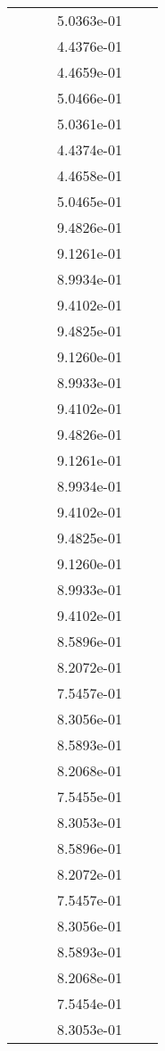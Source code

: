 \begin{xltabular}{\textwidth}{r|rS[table-format=1.3e+2]S[table-format=1.4e+2]S[table-format=1.4e+2]S[table-format=-1.5]}
&  &  & 5.0363e-01 & & \\
&  &  & 4.4376e-01 & & \\
&  &  & 4.4659e-01 & & \\
&  &  & 5.0466e-01 & & \\
&  &  & 5.0361e-01 & & \\
&  &  & 4.4374e-01 & & \\
&  &  & 4.4658e-01 & & \\
&  &  & 5.0465e-01 & & \\
&  &  & 9.4826e-01 & & \\
&  &  & 9.1261e-01 & & \\
&  &  & 8.9934e-01 & & \\
&  &  & 9.4102e-01 & & \\
&  &  & 9.4825e-01 & & \\
&  &  & 9.1260e-01 & & \\
&  &  & 8.9933e-01 & & \\
&  &  & 9.4102e-01 & & \\
&  &  & 9.4826e-01 & & \\
&  &  & 9.1261e-01 & & \\
&  &  & 8.9934e-01 & & \\
&  &  & 9.4102e-01 & & \\
&  &  & 9.4825e-01 & & \\
&  &  & 9.1260e-01 & & \\
&  &  & 8.9933e-01 & & \\
&  &  & 9.4102e-01 & & \\
&  &  & 8.5896e-01 & & \\
&  &  & 8.2072e-01 & & \\
&  &  & 7.5457e-01 & & \\
&  &  & 8.3056e-01 & & \\
&  &  & 8.5893e-01 & & \\
&  &  & 8.2068e-01 & & \\
&  &  & 7.5455e-01 & & \\
&  &  & 8.3053e-01 & & \\
&  &  & 8.5896e-01 & & \\
&  &  & 8.2072e-01 & & \\
&  &  & 7.5457e-01 & & \\
&  &  & 8.3056e-01 & & \\
&  &  & 8.5893e-01 & & \\
&  &  & 8.2068e-01 & & \\
&  &  & 7.5454e-01 & & \\
&  &  & 8.3053e-01 & & \\

\end{xltabular}
